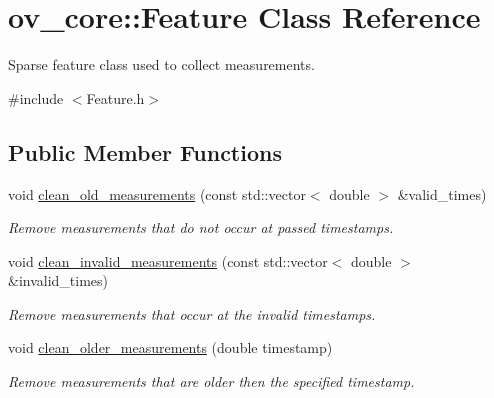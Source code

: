 \hypertarget{classov__core_1_1Feature}{}\section{ov\+\_\+core\+:\+:Feature Class Reference}
\label{classov__core_1_1Feature}


Sparse feature class used to collect measurements.  




{\ttfamily \#include $<$Feature.\+h$>$}

\subsection*{Public Member Functions}
\begin{DoxyCompactItemize}
\item 
void \hyperlink{classov__core_1_1Feature_aee27e65f3de5581ededd30646479e315}{clean\+\_\+old\+\_\+measurements} (const std\+::vector$<$ double $>$ \&valid\+\_\+times)
\begin{DoxyCompactList}\small\item\em Remove measurements that do not occur at passed timestamps. \end{DoxyCompactList}\item 
void \hyperlink{classov__core_1_1Feature_a9daa91fb3836d23563bdc9aad6686ee1}{clean\+\_\+invalid\+\_\+measurements} (const std\+::vector$<$ double $>$ \&invalid\+\_\+times)
\begin{DoxyCompactList}\small\item\em Remove measurements that occur at the invalid timestamps. \end{DoxyCompactList}\item 
void \hyperlink{classov__core_1_1Feature_ad5426e15b7fb0f1f315c12465c63787d}{clean\+\_\+older\+\_\+measurements} (double timestamp)
\begin{DoxyCompactList}\small\item\em Remove measurements that are older then the specified timestamp. \end{DoxyCompactList}\end{DoxyCompactItemize}
